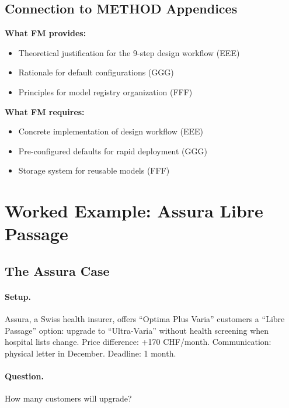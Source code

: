 \subsection{Connection to METHOD Appendices}

\begin{tcolorbox}[colback=yellow!5!white, colframe=yellow!75!black,
    title=Integration: FM $\leftrightarrow$ METHOD Appendices]
\textbf{What FM provides:}
\begin{itemize}[nosep]
\item Theoretical justification for the 9-step design workflow (EEE)
\item Rationale for default configurations (GGG)
\item Principles for model registry organization (FFF)
\end{itemize}

\textbf{What FM requires:}
\begin{itemize}[nosep]
\item Concrete implementation of design workflow (EEE)
\item Pre-configured defaults for rapid deployment (GGG)
\item Storage system for reusable models (FFF)
\end{itemize}
\end{tcolorbox}


\section{Worked Example: Assura Libre Passage}
\label{sec:fm-example}

\subsection{The Assura Case}

\paragraph{Setup.} Assura, a Swiss health insurer, offers ``Optima Plus Varia'' customers a ``Libre Passage'' option: upgrade to ``Ultra-Varia'' without health screening when hospital lists change. Price difference: +170 CHF/month. Communication: physical letter in December. Deadline: 1 month.

\paragraph{Question.} How many customers will upgrade?

